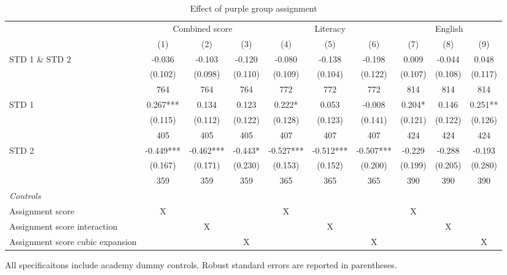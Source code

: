 \begin{table}[htbp]
  \centering
  \caption{Effect of purple group assignment}
  
  \begin{threeparttable}
  
    \begin{tabular}{lccccccccc}
    \toprule
    \toprule
          & \multicolumn{3}{c}{Combined score} & \multicolumn{3}{c}{Literacy} & \multicolumn{3}{c}{English} \\
          & (1)   & (2)   & (3)   & (4)   & (5)   & (6)   & (7)   & (8)   & (9) \\
    \midrule
    STD 1 \& STD 2 & -0.036 & -0.103 & -0.120 & -0.080 & -0.138 & -0.198 & 0.009 & -0.044 & 0.048 \\
          & (0.102) & (0.098) & (0.110) & (0.109) & (0.104) & (0.122) & (0.107) & (0.108) & (0.117) \\
          & 764   & 764   & 764   & 772   & 772   & 772   & 814   & 814   & 814 \\
    STD 1 & 0.267*** & 0.134 & 0.123 & 0.222* & 0.053 & -0.008 & 0.204* & 0.146 & 0.251** \\
          & (0.115) & (0.112) & (0.122) & (0.128) & (0.123) & (0.141) & (0.121) & (0.122) & (0.126) \\
          & 405   & 405   & 405   & 407   & 407   & 407   & 424   & 424   & 424 \\
    STD 2 & -0.449*** & -0.462*** & -0.443* & -0.527*** & -0.512*** & -0.507*** & -0.229 & -0.288 & -0.193 \\
          & (0.167) & (0.171) & (0.230) & (0.153) & (0.152) & (0.200) & (0.199) & (0.205) & (0.280) \\
          & 359   & 359   & 359   & 365   & 365   & 365   & 390   & 390   & 390 \\
    \midrule
    \textit{Controls} &       &       &       &       &       &       &       &       &  \\
    Assignment score & X     &       &       & X     &       &       & X     &       &  \\
    Assignment score interaction &       & X     &       &       & X     &       &       & X     &  \\
    Assignment score cubic expansion &       &       & X     &       &       & X     &       &       & X \\
    \bottomrule
    \bottomrule
    \end{tabular}%
    \begin{tablenotes}
    \item All specificaitons include academy dummy controls. Robust standard errors are reported in parentheses.
    \end{tablenotes}
    
    \end{threeparttable}
    
  \label{tab:discontinuity}%
\end{table}%